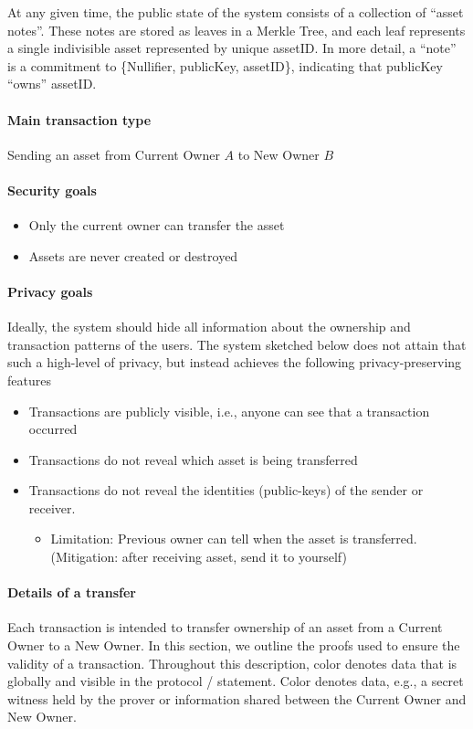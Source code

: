 At any given time, the public state of the system consists of a collection of ``asset notes''.  These notes are stored as leaves in a Merkle Tree, and each leaf represents a single indivisible asset represented by unique assetID.  In more detail, a ``note'' is a commitment to \{Nullifier, publicKey, assetID\}, indicating that publicKey ``owns'' assetID.


\paragraph[:]{Main transaction type} 
Sending an asset from Current Owner $A$ to New Owner $B$


\paragraph[:]{Security goals}
\begin{itemize} 
    \item Only the current owner can transfer the asset
    \item Assets are never created or destroyed
\end{itemize}


\paragraph[:]{Privacy goals} 
Ideally, the system should hide all information about the ownership and transaction patterns of the users.
The system sketched below does not attain that such a high-level of privacy, but instead achieves the following privacy-preserving features
\begin{itemize}
	\item Transactions are publicly visible, i.e., anyone can see that a transaction occurred
    \item Transactions do not reveal which asset is being transferred
    \item Transactions do not reveal the identities (public-keys) of the sender or receiver.
	\begin{itemize}
        \item Limitation: Previous owner can tell when the asset is transferred.  (Mitigation: after receiving asset, send it to yourself)
	\end{itemize}
\end{itemize}



\paragraph[:]{Details of a transfer}
Each transaction is intended to transfer ownership of an asset from a Current Owner to a New Owner.  
In this section, we outline the proofs used to ensure the validity of a transaction. 
Throughout this description, color  denotes data that is globally and  visible in the protocol / statement.
Color  denotes  data, e.g., a secret witness held by the prover or information shared between the Current Owner and New Owner.

